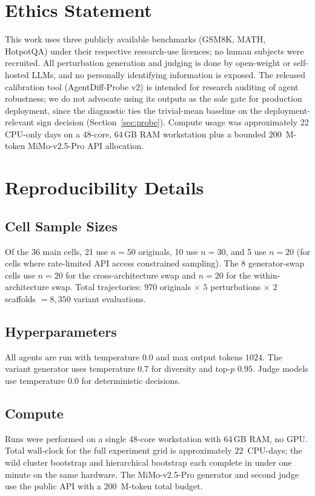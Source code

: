 \documentclass[11pt]{article}
\begin{document}
\section*{Ethics Statement}

This work uses three publicly available benchmarks (GSM8K, MATH, HotpotQA) under their respective research-use licences; no human subjects were recruited. All perturbation generation and judging is done by open-weight or self-hosted LLMs, and no personally identifying information is exposed. The released calibration tool (AgentDiff-Probe v2) is intended for research auditing of agent robustness; we do not advocate using its outputs as the sole gate for production deployment, since the diagnostic ties the trivial-mean baseline on the deployment-relevant sign decision (Section~\ref{sec:probe}). Compute usage was approximately 22 CPU-only days on a 48-core, 64\,GB RAM workstation plus a bounded $200$~M-token MiMo-v2.5-Pro API allocation.



\appendix

\section{Reproducibility Details}
\label{sec:appendix-reproducibility}

\subsection{Cell Sample Sizes}

Of the 36 main cells, 21 use $n=50$ originals, 10 use $n=30$, and 5 use $n=20$ (for cells where rate-limited API access constrained sampling). The 8 generator-swap cells use $n=20$ for the cross-architecture swap and $n=20$ for the within-architecture swap. Total trajectories: $970$ originals $\times$ $5$ perturbations $\times$ $2$ scaffolds $=8{,}350$ variant evaluations.

\subsection{Hyperparameters}

All agents are run with temperature $0.0$ and max output tokens $1024$. The variant generator uses temperature $0.7$ for diversity and top-$p$ $0.95$. Judge models use temperature $0.0$ for deterministic decisions.

\subsection{Compute}

Runs were performed on a single 48-core workstation with 64\,GB RAM, no GPU. Total wall-clock for the full experiment grid is approximately $22$~CPU-days; the wild cluster bootstrap and hierarchical bootstrap each complete in under one minute on the same hardware. The MiMo-v2.5-Pro generator and second judge use the public API with a $200$~M-token total budget.
\end{document}
